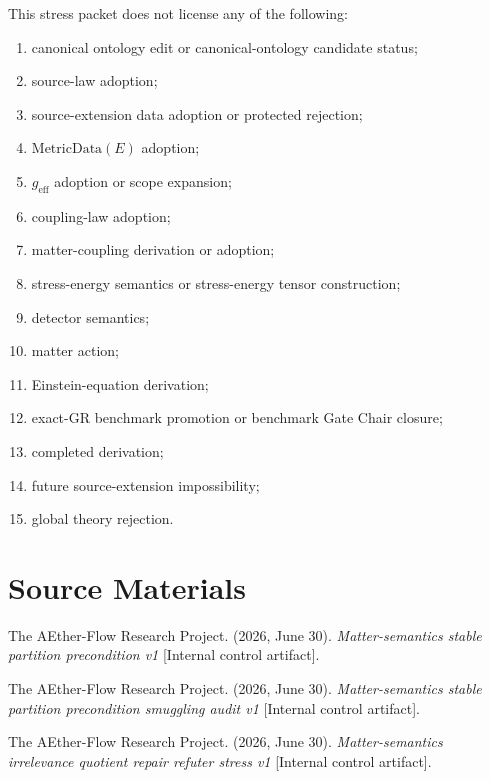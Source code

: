 This stress packet does not license any of the following:
\begin{enumerate}
  \item canonical ontology edit or canonical-ontology candidate status;
  \item source-law adoption;
  \item source-extension data adoption or protected rejection;
  \item \(\mathrm{MetricData}(E)\) adoption;
  \item \(g_{\mathrm{eff}}\) adoption or scope expansion;
  \item coupling-law adoption;
  \item matter-coupling derivation or adoption;
  \item stress-energy semantics or stress-energy tensor construction;
  \item detector semantics;
  \item matter action;
  \item Einstein-equation derivation;
  \item exact-GR benchmark promotion or benchmark Gate Chair closure;
  \item completed derivation;
  \item future source-extension impossibility;
  \item global theory rejection.
\end{enumerate}

\section{Source Materials}

The AEther-Flow Research Project. (2026, June 30). \emph{Matter-semantics
stable partition precondition v1} [Internal control artifact].

The AEther-Flow Research Project. (2026, June 30). \emph{Matter-semantics
stable partition precondition smuggling audit v1} [Internal control
artifact].

The AEther-Flow Research Project. (2026, June 30). \emph{Matter-semantics
irrelevance quotient repair refuter stress v1} [Internal control artifact].
